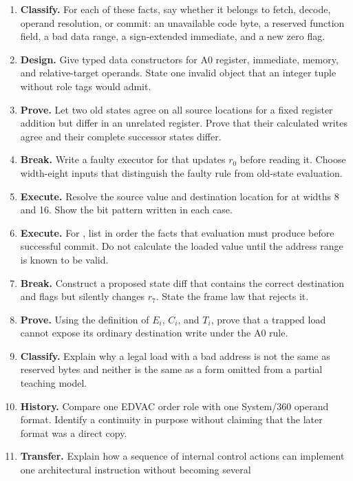 \begin{enumerate}
architecture you know. Identify the assembly statement, encoded instruction,
decoded instance, and transition. Which arrow is not one-to-one?
\item \textbf{Classify.} For each of these facts, say whether it belongs to
fetch, decode, operand resolution, or commit: an unavailable code byte, a
reserved function field, a bad data range, a sign-extended immediate, and a
new zero flag.
\item \textbf{Design.} Give typed data constructors for A0 register,
immediate, memory, and relative-target operands. State one invalid object that
an integer tuple without role tags would admit.
\item \textbf{Prove.} Let two old states agree on all source locations for a
fixed register addition but differ in an unrelated register. Prove that their
calculated writes agree and their complete successor states differ.
\item \textbf{Break.} Write a faulty executor for  that
updates \(r_0\) before reading it. Choose width-eight inputs that distinguish
the faulty rule from old-state evaluation.
\item \textbf{Execute.} Resolve the source value and destination location for
 at widths 8 and 16. Show the bit pattern written in each
case.
\item \textbf{Execute.} For , list in order the facts
that evaluation must produce before successful commit. Do not calculate the
loaded value until the address range is known to be valid.
\item \textbf{Break.} Construct a proposed state diff that contains the
correct destination and flags but silently changes \(r_7\). State the frame
law that rejects it.
\item \textbf{Prove.} Using the definition of \(E_i\), \(C_i\), and \(T_i\),
prove that a trapped load cannot expose its ordinary destination write under
the A0 rule.
\item \textbf{Classify.} Explain why a legal load with a bad address is not
the same as reserved bytes and neither is the same as a form omitted from a
partial teaching model.
\item \textbf{History.} Compare one EDVAC order role with one System/360
operand format. Identify a continuity in purpose without claiming that the
later format was a direct copy.
\item \textbf{Transfer.} Explain how a sequence of internal control actions
can implement one architectural instruction without becoming several

\end{enumerate}
